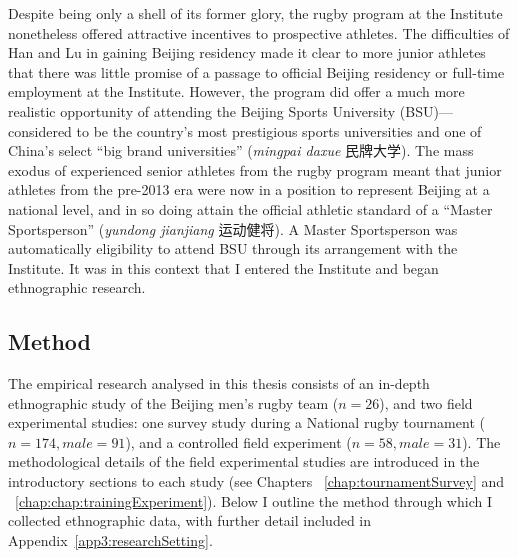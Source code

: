 \begin{CJK}{UTF8}{gbsn}
Despite being only a shell of its former glory, the rugby program at the Institute nonetheless offered attractive incentives to prospective athletes.  The difficulties of Han and Lu in gaining Beijing residency made it clear to more junior athletes that there was little promise of a passage to official Beijing residency or full-time employment at the Institute.  However, the program did offer a much more realistic opportunity of attending the Beijing Sports University (BSU)---considered to be the country's most prestigious sports universities and one of China's select ``big brand universities'' (\textit{mingpai daxue} 民牌大学).  The mass exodus of experienced senior athletes from the rugby program meant that junior athletes from the pre-2013 era were now in a position to represent Beijing at a national level, and in so doing attain the official athletic standard of a ``Master Sportsperson'' (\textit{yundong jianjiang} 运动健将).  A Master Sportsperson was automatically eligibility to attend BSU through its arrangement with the Institute.  It was in this context that I entered the Institute and began ethnographic research.






\subsection{Method}
The empirical research analysed in this thesis consists of an  in-depth ethnographic study of the Beijing men's rugby team ($n = 26$), and two field experimental studies: one survey study during a National rugby tournament ($n = 174, male = 91$), and a controlled field experiment ($n = 58, male = 31$).  The methodological details of the field experimental studies are introduced in the introductory sections to each study (see Chapters ~\ref{chap:tournamentSurvey} and ~\ref{chap:chap:trainingExperiment}).  Below I outline the method through which I collected ethnographic data, with further detail included in Appendix~\ref{app3:researchSetting}.


\end{CJK}
